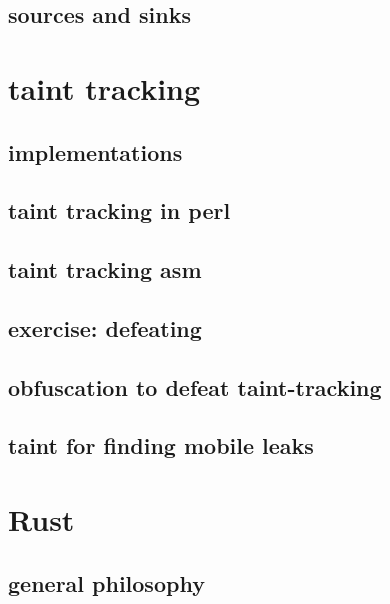 \subsection{sources and sinks}


\section{taint tracking}


\subsection{implementations}


\subsection{taint tracking in perl}


\subsection{taint tracking asm}


\subsection{exercise: defeating} 


\subsection{obfuscation to defeat taint-tracking}


\subsection{taint for finding mobile leaks}


\section{Rust}


\subsection{general philosophy}



